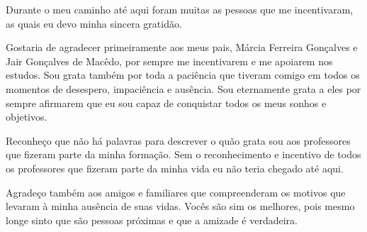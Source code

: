 \begin{agradecimentos}
Durante o meu caminho até aqui foram muitas as pessoas que me incentivaram, as quais eu devo minha sincera gratidão. 

Gostaria de agradecer primeiramente aos meus pais, Márcia Ferreira Gonçalves e Jair Gonçalves de Macêdo, por sempre me incentivarem e me apoiarem nos estudos. Sou grata também por toda a paciência que tiveram comigo em todos os momentos de desespero, impaciência e ausência. Sou eternamente grata a eles por sempre afirmarem que eu sou capaz de conquistar todos os meus sonhos e objetivos.

Reconheço que não há palavras para descrever o quão grata sou aos professores que fizeram parte da minha formação. Sem o reconhecimento e incentivo de todos os professores que fizeram parte da minha vida eu não teria chegado até aqui.

Agradeço também aos amigos e familiares que compreenderam os motivos que levaram à minha ausência de suas vidas. Vocês são sim os melhores, pois mesmo longe sinto que são pessoas próximas e que a amizade é verdadeira. 

\end{agradecimentos}
